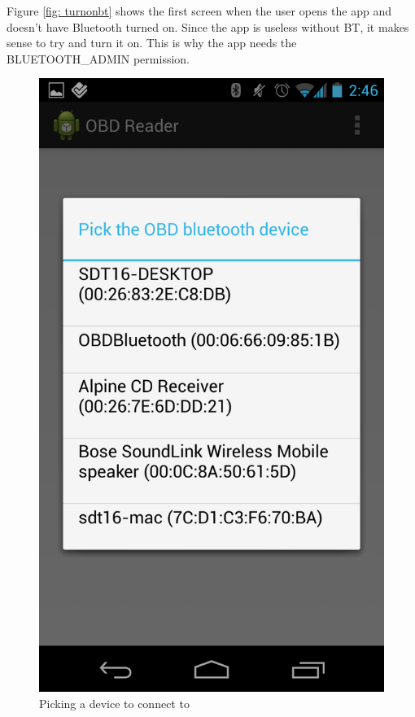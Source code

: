 \documentclass[12pt,letterpaper]{article}
\begin{document}
Figure \ref{fig: turnonbt} shows the first screen when the user opens the app and doesn't have Bluetooth turned on. Since the app is useless without BT, it makes sense to try and turn it on. This is why the app needs the BLUETOOTH\_ADMIN permission.

\begin{figure}[H]
\centering
\includegraphics[totalheight=15cm]{images/pickdevice.png}
\caption{Picking a device to connect to}
\label{fig: pickdevice}
\end{figure}
\end{document}
